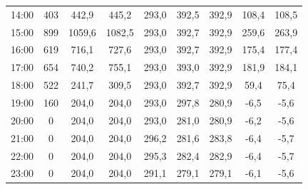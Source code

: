 \begin{table}[!h]
{\begin{tabular}{ccccccccc}
14:00 & 403 & 442,9  & 445,2  & 293,0 & 392,5 & 392,9 & 108,4 & 108,5 \\
15:00 & 899 & 1059,6 & 1082,5 & 293,0 & 392,7 & 392,9 & 259,6 & 263,9 \\
16:00 & 619 & 716,1  & 727,6  & 293,0 & 392,7 & 392,9 & 175,4 & 177,4 \\
17:00 & 654 & 740,2  & 755,1  & 293,0 & 393,0 & 392,9 & 181,9 & 184,1 \\
18:00 & 522 & 241,7  & 309,5  & 293,0 & 392,7 & 392,9 & 59,4  & 75,4  \\
19:00 & 160 & 204,0  & 204,0  & 293,0 & 297,8 & 280,9 & -6,5  & -5,6  \\
20:00 & 0   & 204,0  & 204,0  & 293,0 & 281,0 & 280,9 & -6,2  & -5,6  \\
21:00 & 0   & 204,0  & 204,0  & 296,2 & 281,6 & 283,8 & -6,4  & -5,7  \\
22:00 & 0   & 204,0  & 204,0  & 295,3 & 282,4 & 282,9 & -6,4  & -5,7  \\
23:00 & 0   & 204,0  & 204,0  & 291,1 & 279,1 & 279,1 & -6,1  & -5,6 
\end{tabular}%
}
\end{table}






